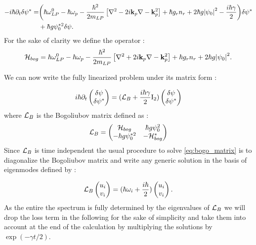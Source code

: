 \begin{equation}
    \begin{split}
    -i  \hbar \partial_t \delta\psi^* = &\biggl(\hbar\omega_{LP}^0 - \hbar \omega_p-\dfrac{\hbar^2}{2m_{LP}}\left[\nabla^2 -2i\mathbf{k}_p\nabla-\mathbf{k}_p^2\right]+\hbar g_rn_r + 2\hbar g \abs{\psi_0}^2- \dfrac{i\hbar\gamma}{2}\biggr) \delta\psi^* \\
      &+ \hbar g \psi_0^{*2} \delta\psi.
    \end{split}
    \label{eq:bogo_v2}
\end{equation}
For the sake of clarity we define the operator :
\begin{equation}
    \mathcal{H}_{bog}= \hbar\omega_{LP}^0 - \hbar \omega_p-\dfrac{\hbar^2}{2m_{LP}}\left[\nabla^2 +2i\mathbf{k}_p\nabla-\mathbf{k}_p^2\right]+\hbar g_rn_r + 2\hbar g \abs{\psi_0}^2.
    \label{eq:hambog}
\end{equation}

We can now write the fully linearized problem under its matrix form :

\begin{equation}
    \begin{matrix}i\hbar \partial_t
        \begin{pmatrix}
             \delta\psi \\
             \delta\psi^*
        \end{pmatrix}
        = (\mathcal{L}_B  +\dfrac{i\hbar\gamma}{2}\mathrm{I_2})
        \begin{pmatrix}
             \delta\psi \\
             \delta\psi^*
        \end{pmatrix}
    \end{matrix}
    \label{eq:bogo_matrix}
\end{equation}
where $\mathcal{L}_B$ is the Bogoliubov matrix defined as :
\begin{equation}
    \begin{matrix}
    \mathcal{L}_B =
    \begin{pmatrix}
        \mathcal{H}_{bog} &  \hbar g \psi_0^2\\
        -\hbar g \psi_0^{*2} & -\mathcal{H}_{bog}^*
    \end{pmatrix}
\end{matrix}
\end{equation} 
Since $\mathcal{L}_B$ is time independent the usual procedure to solve \autoref{eq:bogo_matrix} is to diagonalize the Bogoliubov matrix and write any generic solution 
in the basis of eigenmodes defined by :

\begin{equation}
    \mathcal{L}_B \begin{pmatrix}
        u_{i} \\
        v_{i}
    \end{pmatrix} = (\hbar\omega_i+\dfrac{i\hbar}{2}) \begin{pmatrix}
        u_{i} \\
        v_{i}
    \end{pmatrix}.
\end{equation}
As the entire the spectrum is fully determined by the eigenvalues of $\mathcal{L}_B$ we will drop the loss term in the following for the sake of simplicity and 
take them into account at the end of the calculation by multiplying the solutions by $\exp(-\gamma t/2)$.

